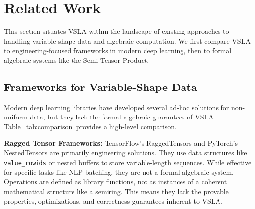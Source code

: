 \section{Related Work}  
\label{sec:related}

This section situates VSLA within the landscape of existing approaches to handling variable-shape data and algebraic computation. We first compare VSLA to engineering-focused frameworks in modern deep learning, then to formal algebraic systems like the Semi-Tensor Product.

\subsection{Frameworks for Variable-Shape Data}

Modern deep learning libraries have developed several ad-hoc solutions for non-uniform data, but they lack the formal algebraic guarantees of VSLA. Table~\ref{tab:comparison} provides a high-level comparison.

\begin{table}[h!]
\centering
\caption{Comparison of Approaches to Variable-Shape Data}
\label{tab:comparison}
\end{table}

\textbf{Ragged Tensor Frameworks:} TensorFlow's RaggedTensors \cite{TF2024} and PyTorch's NestedTensors \cite{PyTorch2023} are primarily engineering solutions. They use data structures like \texttt{value\_rowids} or nested buffers to store variable-length sequences. While effective for specific tasks like NLP batching, they are not a formal algebraic system. Operations are defined as library functions, not as instances of a coherent mathematical structure like a semiring. This means they lack the provable properties, optimizations, and correctness guarantees inherent to VSLA.

